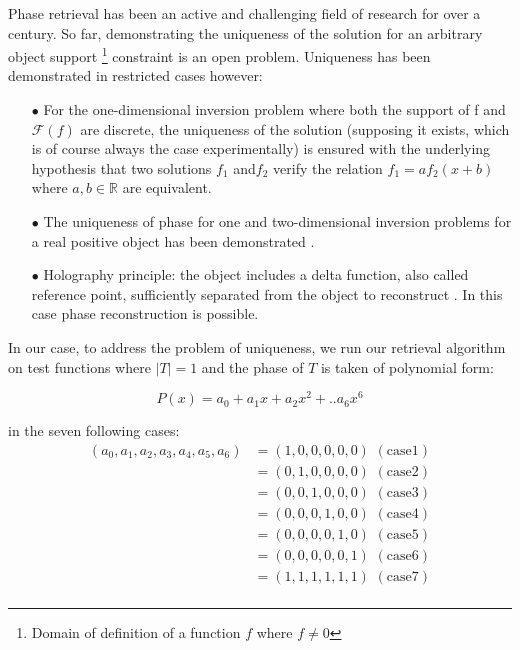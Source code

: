 \noindent Phase retrieval has been an active and challenging field of research for over a century. So far, demonstrating the uniqueness of the solution for an arbitrary object support \footnote{Domain of definition of a function $f$ where $f \ne 0$} constraint is an open problem. Uniqueness has been demonstrated in restricted cases however:
 \begin{itemize} 
\item[$\bullet$]  For the one-dimensional inversion problem where both the support of f and $\mathscr{F}( f )$ are discrete, the uniqueness of the solution (supposing it exists, which is of course always the case experimentally) is ensured \cite{crimmins1983uniqueness} with the underlying hypothesis that two solutions $f_1$ and$f_2$ verify the relation $f_1 = a f_2(x + b)$ where $a,b \in \mathbb{R}$ are equivalent.
\item[$\bullet$]  The uniqueness of  phase for one and two-dimensional inversion problems for a real positive object has been demonstrated \cite{bruck1979ambiguity,hayes1982reconstruction}.
\item[$\bullet$] Holography principle: the object includes a delta function, also called reference point, sufficiently separated from the object to reconstruct \cite{fienup1983holographic,fienup1984experimental}. In this case phase reconstruction is possible.
\end{itemize}
\vspace{5px}

\noindent In our case, to address the problem of uniqueness, we run our retrieval algorithm on test functions where $|T| = 1$ and the phase of $T$ is taken of polynomial form:

\begin{equation}
P(x) = a_0 + a_1x + a_2 x^2+ .. a_6 x^6
\end{equation}

\noindent in the seven following cases: 
\begin{equation} \label{eq1}
\begin{split}
(a_0,a_1,a_2,a_3,a_4,a_5,a_6) & = (1,0,0,0,0,0)\,\,\mathrm{(case 1)}\\
 & =(0,1,0,0,0,0)\,\,\mathrm{(case 2)}\\
  & =(0,0,1,0,0,0)\,\,\mathrm{(case 3)}\\
   & =(0,0,0,1,0,0)\,\,\mathrm{(case 4)}\\
    & =(0,0,0,0,1,0)\,\,\mathrm{(case 5)}\\
     & =(0,0,0,0,0,1)\,\,\mathrm{(case 6)}\\
      & =(1,1,1,1,1,1)\,\,\mathrm{(case 7)}\\
\end{split}
\end{equation}

